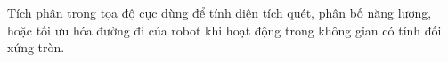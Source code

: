 \documentclass[preview]{standalone}
\begin{document}
\begin{center}
Tích phân trong tọa độ cực dùng để tính diện tích quét, phân bố năng lượng, hoặc tối ưu hóa đường đi của robot khi hoạt động trong không gian có tính đối xứng tròn.
\end{center}
\end{document}
